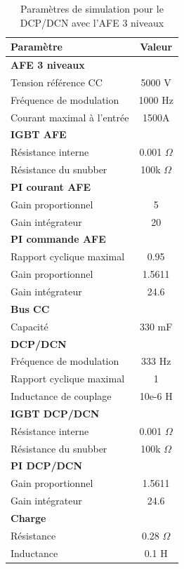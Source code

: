 \begin{table}[htb]
\centering
\begin{tabular}{|l|c|} 
  \hline
  \textbf{Paramètre} & \textbf{Valeur}  \\
  \hline\hline \hline
  \multicolumn{2}{|l|}{\textbf{AFE 3 niveaux}}\\ \hline \hline 
  Tension référence CC & 5000 V\\ \hline
  Fréquence de modulation & 1000 Hz \\ \hline
  Courant maximal à l'entrée& 1500A \\ \hline \hline
  \multicolumn{2}{|l|}{\textbf{IGBT AFE}}\\ \hline
  Résistance interne & 0.001 $\Omega$\\
  Résistance du snubber & 100k $\Omega$\\ \hline \hline
   \multicolumn{2}{|l|}{\textbf{PI courant AFE}}\\ \hline
  Gain proportionnel & 5 \\
  Gain intégrateur & 20 \\ \hline \hline
  \multicolumn{2}{|l|}{\textbf{PI commande AFE}}\\ \hline
  Rapport cyclique maximal & 0.95\\
  Gain proportionnel & 1.5611 \\
  Gain intégrateur & 24.6 \\ \hline \hline
  \multicolumn{2}{|l|}{\textbf{Bus CC}}\\ \hline
  Capacité & 330 mF\\
  \hline \hline \hline
  
  \multicolumn{2}{|l|}{\textbf{DCP/DCN}}\\ \hline \hline
  Fréquence de modulation & 333 Hz\\ \hline
  Rapport cyclique maximal & 1 \\ \hline
  Inductance de couplage & 10e-6 H \\ \hline \hline
  \multicolumn{2}{|l|}{\textbf{IGBT DCP/DCN}}\\ \hline
  Résistance interne & 0.001 $\Omega$\\
  Résistance du snubber & 100k $\Omega$\\ \hline \hline
   \multicolumn{2}{|l|}{\textbf{PI DCP/DCN}}\\ \hline
  Gain proportionnel & 1.5611 \\
  Gain intégrateur & 24.6 \\ \hline \hline
  \multicolumn{2}{|l|}{\textbf{Charge}}\\ \hline
  Résistance & 0.28 $\Omega$\\
  Inductance & 0.1 H \\
  \hline
\end{tabular}
\caption{Paramètres de simulation pour le DCP/DCN avec l'AFE 3 niveaux}
\label{p_AF_DCP}
\end{table}

